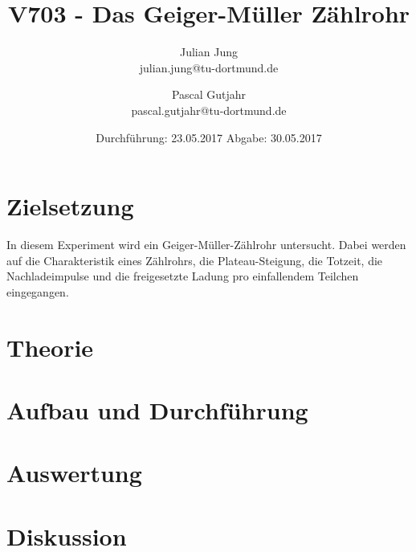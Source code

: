 

\title{V703 - Das Geiger-Müller Zählrohr}
\author{Julian Jung \\ julian.jung@tu-dortmund.de
  \and Pascal Gutjahr \\ pascal.gutjahr@tu-dortmund.de}
  \date{Durchführung: 23.05.2017
  \hspace{3em}
  Abgabe: 30.05.2017}
  
\maketitle
\newpage
\tableofcontents
\newpage
\section{Zielsetzung}
In diesem Experiment wird ein Geiger-Müller-Zählrohr untersucht. Dabei werden auf
die Charakteristik eines Zählrohrs, die Plateau-Steigung, die Totzeit, die
Nachladeimpulse und die freigesetzte Ladung pro einfallendem Teilchen eingegangen.
\section{Theorie}
 
\section{Aufbau und Durchführung}
 
\section{Auswertung}
 
\section{Diskussion}

\printbibliography

